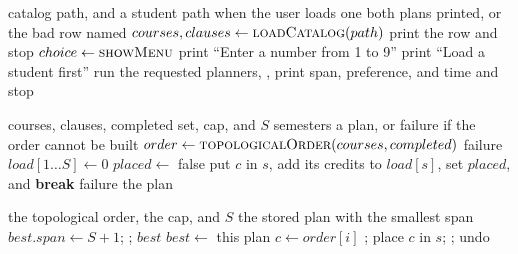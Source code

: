 \documentclass[10pt]{article}
\begin{document}
\begin{algorithm}[H]
\caption{Main program}
\footnotesize
\begin{algorithmic}[1]
\Require catalog path, and a student path when the user loads one
\Ensure both plans printed, or the bad row named
\State $courses, clauses \gets \Call{loadCatalog}{path}$
    \State print the row and stop
\EndIf
\State {}
\Repeat
    \State $choice \gets \Call{showMenu}{}$
     \State print ``Enter a number from 1 to 9''
         \State print ``Load a student first''
        \Else \State run the requested planners, , print span, preference, and time
        \EndIf
     \State {} and stop
    \EndIf
{}
\end{algorithmic}
\end{algorithm}

\begin{algorithm}[H]
\caption{Earliest-semester packing}
\footnotesize
\begin{algorithmic}[1]
\Require courses, clauses, completed set, cap, and $S$ semesters
\Ensure a plan, or failure if the order cannot be built
\State $order \gets \Call{topologicalOrder}{courses, completed}$
 \State \Return failure \EndIf
\State $load[1 \ldots S] \gets 0$
    \State $placed \gets$ false
            \State put $c$ in $s$, add its credits to $load[s]$, set $placed$, and \textbf{break}
        \EndIf
    \EndFor
     \State \Return failure \EndIf
\EndFor
\State \Return the plan
\end{algorithmic}
\end{algorithm}

\begin{algorithm}[H]
\caption{Backtracking plan}
\label{alg:bt}
\footnotesize
\begin{algorithmic}[1]
\Require the topological order, the cap, and $S$
\Ensure the stored plan with the smallest span
\State $best.span \gets S + 1$; \quad {}; \quad \Return $best$
\Statex
{}
         \State $best \gets$ this plan \EndIf
        \State \Return
    \EndIf
    \State $c \gets order[i]$
     \State {}; \quad \Return \EndIf
         \State \Return \EndIf
            \State place $c$ in $s$; \quad {}; \quad undo
        \EndIf
    \EndFor
\EndFunction
\end{algorithmic}
\end{algorithm}
\end{document}
